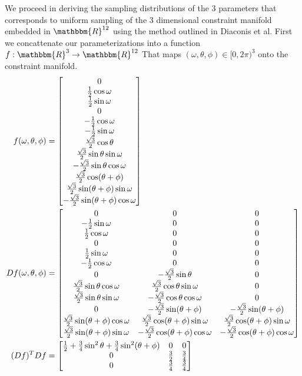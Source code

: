 \documentclass[12pt]{article}
\newcommand*{\Scale}[2][4]{\scalebox{#1}{$#2$}}%
\begin{document}
We proceed in deriving the sampling distributions of the 3 parameters that corresponds to uniform sampling of the 3 dimensional constraint manifold embedded in $\mathbbm{R}^{12}$ using the method outlined in Diaconis et al. First we concattenate our parameterizations into a function $f: \mathbbm{R}^3 \to \mathbbm{R}^{12}$ That maps $(\omega, \theta, \phi) \in [0, 2\pi)^3$ onto the constraint manifold. 
\begin{align}
f(\omega, \theta, \phi) &= \Scale[1.0]{\begin{bmatrix}
0 \\ \frac{1}{2}\cos\omega \\ \frac{1}{2}\sin\omega \\ 0 \\ -\frac{1}{2}\cos\omega \\ -\frac{1}{2}\sin\omega \\
\frac{\sqrt{3}}{2}\cos\theta \\ \frac{\sqrt{3}}{2}\sin\theta\sin\omega \\ -\frac{\sqrt{3}}{2}\sin\theta\cos\omega  \\ 
\frac{\sqrt{3}}{2}\cos(\theta+\phi) \\ \frac{\sqrt{3}}{2}\sin(\theta+\phi)\sin\omega \\ -\frac{\sqrt{3}}{2}\sin(\theta+\phi)\cos\omega
\end{bmatrix}} \\
Df(\omega, \theta, \phi) &= \Scale[1.0]{\begin{bmatrix}
0 & 0 & 0\\ 
-\frac{1}{2}\sin\omega  & 0 & 0 \\ 
\frac{1}{2}\cos\omega  & 0 & 0 \\ 
0  & 0 & 0 \\ 
\frac{1}{2}\sin\omega  & 0 & 0 \\ 
-\frac{1}{2}\cos\omega  & 0 & 0 \\
0 & -\frac{\sqrt{3}}{2}\sin\theta & 0 \\ 
\frac{\sqrt{3}}{2}\sin\theta\cos\omega &\frac{\sqrt{3}}{2}\cos\theta\sin\omega & 0 \\ 
\frac{\sqrt{3}}{2}\sin\theta\sin\omega   & -\frac{\sqrt{3}}{2}\cos\theta\cos\omega & 0 \\ 
0 & -\frac{\sqrt{3}}{2}\sin(\theta+\phi) & -\frac{\sqrt{3}}{2}\sin(\theta+\phi) \\ 
\frac{\sqrt{3}}{2}\sin(\theta+\phi)\cos\omega & \frac{\sqrt{3}}{2}\cos(\theta+\phi)\sin\omega & \frac{\sqrt{3}}{2}\cos(\theta+\phi)\sin\omega   \\ 
\frac{\sqrt{3}}{2}\sin(\theta+\phi)\sin\omega & -\frac{\sqrt{3}}{2}\cos(\theta+\phi)\cos\omega  & -\frac{\sqrt{3}}{2}\cos(\theta+\phi)\cos\omega   
\end{bmatrix}} \\
(Df)^TDf &= \Scale[1.0]{\begin{bmatrix}
\frac{1}{2} + \frac{3}{4}\sin^2\theta + \frac{3}{4}\sin^2(\theta + \phi) & 0 & 0 \\
0 & \frac{3}{2} & \frac{3}{4} \\
0 & \frac{3}{4} & \frac{3}{4} 
\end{bmatrix}}
\end{align}
\end{document}
